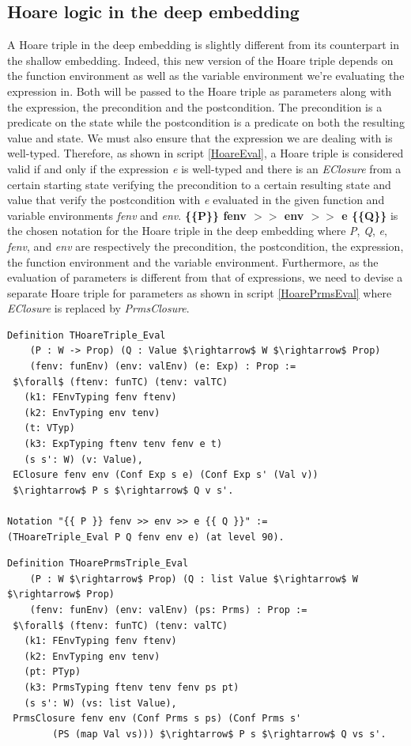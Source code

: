 \subsection{Hoare logic in the deep embedding} \label{HoareDeepSec}
A Hoare triple in the deep embedding is slightly different from its counterpart in the shallow embedding. Indeed, this new version of the Hoare triple depends on the function environment as well as the variable environment we're evaluating the expression in. Both will be passed to the Hoare triple as parameters along with the expression, the precondition and the postcondition. The precondition is a predicate on the state while the postcondition is a predicate on both the resulting value and state. We must also ensure that the expression we are dealing with is well-typed. Therefore, as shown in script \ref{HoareEval}, a Hoare triple is considered valid if and only if the expression \emph{e} is well-typed and there is an \textit{EClosure} from a certain starting state verifying the precondition to a certain resulting state and value that verify the postcondition with \textit{e} evaluated in the given function and variable environments \textit{fenv} and \textit{env}. \textbf{\{\{P\}\} fenv $>>$ env $>>$ e \{\{Q\}\}} is the chosen notation for the Hoare triple in the deep embedding where \textit{P}, \textit{Q}, \textit{e}, \textit{fenv}, and \textit{env} are respectively the precondition, the postcondition, the expression, the function environment and the variable environment. Furthermore, as the evaluation of parameters is different from that of expressions, we need to devise a separate Hoare triple for parameters as shown in script \ref{HoarePrmsEval} where \textit{EClosure} is replaced by \textit{PrmsClosure}.
\pagebreak
\begin{lstlisting}[caption = {Hoare triple for expressions in the deep embedding}, label={HoareEval},mathescape=true]
Definition THoareTriple_Eval
    (P : W -> Prop) (Q : Value $\rightarrow$ W $\rightarrow$ Prop)
    (fenv: funEnv) (env: valEnv) (e: Exp) : Prop :=
 $\forall$ (ftenv: funTC) (tenv: valTC) 
   (k1: FEnvTyping fenv ftenv)
   (k2: EnvTyping env tenv)
   (t: VTyp)
   (k3: ExpTyping ftenv tenv fenv e t) 
   (s s': W) (v: Value),
 EClosure fenv env (Conf Exp s e) (Conf Exp s' (Val v)) 
 $\rightarrow$ P s $\rightarrow$ Q v s'.
 
Notation "{{ P }} fenv >> env >> e {{ Q }}" := 
(THoareTriple_Eval P Q fenv env e) (at level 90).
\end{lstlisting}
\begin{lstlisting}[caption = {Hoare triple for parameters in the deep embedding}, label={HoarePrmsEval},mathescape=true]
Definition THoarePrmsTriple_Eval
    (P : W $\rightarrow$ Prop) (Q : list Value $\rightarrow$ W $\rightarrow$ Prop)
    (fenv: funEnv) (env: valEnv) (ps: Prms) : Prop :=
 $\forall$ (ftenv: funTC) (tenv: valTC) 
   (k1: FEnvTyping fenv ftenv)
   (k2: EnvTyping env tenv)
   (pt: PTyp)
   (k3: PrmsTyping ftenv tenv fenv ps pt)
   (s s': W) (vs: list Value),
 PrmsClosure fenv env (Conf Prms s ps) (Conf Prms s' 
        (PS (map Val vs))) $\rightarrow$ P s $\rightarrow$ Q vs s'.
\end{lstlisting}

